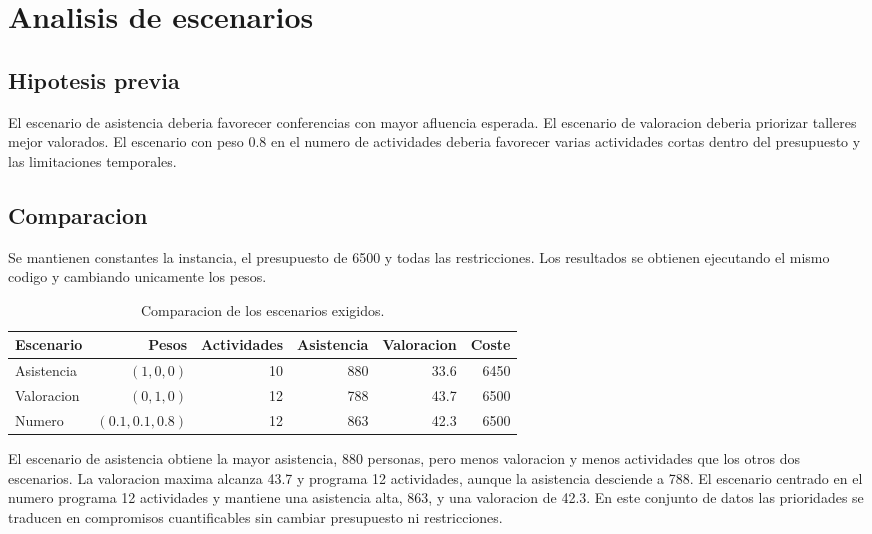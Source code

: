 \section{Analisis de escenarios}

\subsection{Hipotesis previa}

El escenario de asistencia deberia favorecer conferencias con mayor afluencia esperada. El escenario de valoracion deberia priorizar talleres mejor valorados. El escenario con peso $0.8$ en el numero de actividades deberia favorecer varias actividades cortas dentro del presupuesto y las limitaciones temporales.

\subsection{Comparacion}

Se mantienen constantes la instancia, el presupuesto de 6500 y todas las restricciones. Los resultados se obtienen ejecutando el mismo codigo y cambiando unicamente los pesos.

\begin{table}[h]
\centering
\begin{tabular}{lrrrrr}
\hline
Escenario & Pesos & Actividades & Asistencia & Valoracion & Coste \\
\hline
Asistencia & $(1,0,0)$ & 10 & 880 & 33.6 & 6450 \\
Valoracion & $(0,1,0)$ & 12 & 788 & 43.7 & 6500 \\
Numero & $(0.1,0.1,0.8)$ & 12 & 863 & 42.3 & 6500 \\
\hline
\end{tabular}
\caption{Comparacion de los escenarios exigidos.}
\end{table}

El escenario de asistencia obtiene la mayor asistencia, 880 personas, pero menos valoracion y menos actividades que los otros dos escenarios. La valoracion maxima alcanza 43.7 y programa 12 actividades, aunque la asistencia desciende a 788. El escenario centrado en el numero programa 12 actividades y mantiene una asistencia alta, 863, y una valoracion de 42.3. En este conjunto de datos las prioridades se traducen en compromisos cuantificables sin cambiar presupuesto ni restricciones.
